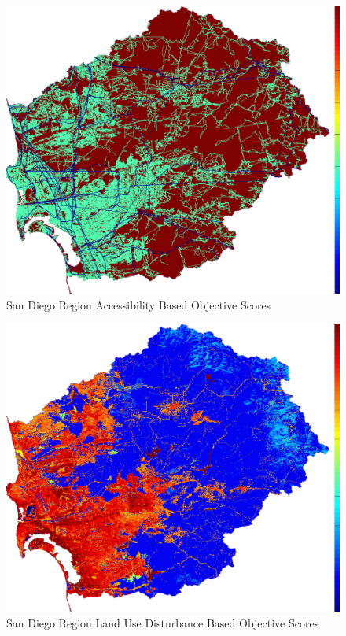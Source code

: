         \begin{figure}[!h]
            \begin{center}
            \includegraphics[width=5.5in]{figures/SanDiego_AccessibilityScore.png}   
            \caption{San Diego Region Accessibility Based Objective Scores}
            \label{fig:SDaccessibilty}
            \end{center}
        \end{figure}

        \begin{figure}[!h]
            \begin{center}
            \includegraphics[width=5.5in]{figures/SanDiego_DisturbanceScore.png}   
            \caption{San Diego Region Land Use Disturbance Based Objective Scores}
            \label{fig:SDdisturbance}
            \end{center}
        \end{figure}
        
